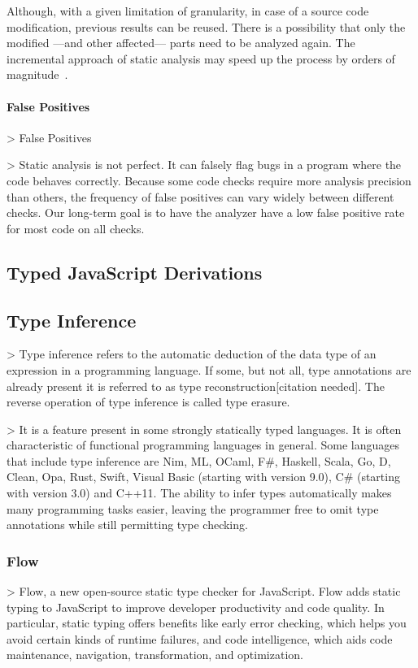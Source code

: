 Although, with a given limitation of granularity, in case of a source code modification, previous results can be reused. There is a possibility that only the modified ---and other affected--- parts need to be analyzed again. The incremental approach of static analysis may speed up the process by orders of magnitude~\cite{stein-daniel-bsc}.

\paragraph{False Positives}
  > False Positives

  > Static analysis is not perfect. It can falsely flag bugs in a program where the code behaves correctly. Because some code checks require more analysis precision than others, the frequency of false positives can vary widely between different checks. Our long-term goal is to have the analyzer have a low false positive rate for most code on all checks.


  \subsection{Typed JavaScript Derivations}

  \subsection{Type Inference}

  > Type inference refers to the automatic deduction of the data type of an expression in a programming language. If some, but not all, type annotations are already present it is referred to as type reconstruction[citation needed]. The reverse operation of type inference is called type erasure.

  > It is a feature present in some strongly statically typed languages. It is often characteristic of functional programming languages in general. Some languages that include type inference are Nim, ML, OCaml, F\#, Haskell, Scala, Go, D, Clean, Opa, Rust, Swift, Visual Basic (starting with version 9.0), C\# (starting with version 3.0) and C++11. The ability to infer types automatically makes many programming tasks easier, leaving the programmer free to omit type annotations while still permitting type checking.


  \subsubsection{Flow}
  > Flow, a new open-source static type checker for JavaScript. Flow adds static typing to JavaScript to improve developer productivity and code quality. In particular, static typing offers benefits like early error checking, which helps you avoid certain kinds of runtime failures, and code intelligence, which aids code maintenance, navigation, transformation, and optimization.

